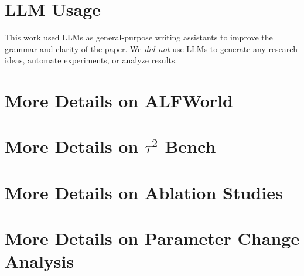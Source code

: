 \documentclass{article}
\theoremstyle{plain}
\theoremstyle{definition}
\theoremstyle{remark}
\begin{document}




\newpage

\setcounter{table}{0}
\renewcommand{\thetable}{A\arabic{table}}
\setcounter{figure}{0}
\renewcommand{\thefigure}{A\arabic{figure}}

\appendix
\onecolumn

\section{LLM Usage}
This work used LLMs as general-purpose writing assistants to improve the grammar and clarity of the paper.
We {\it did not} use LLMs to generate any research ideas, automate experiments, or analyze results.





\section{More Details on ALFWorld}
\label{sec:More Details on ALFWorld}



\section{More Details on $\tau^2$ Bench}
\label{sec:More Details on tau2 Bench}



\section{More Details on Ablation Studies}
\label{sec:More Details on Ablation Studies}



\section{More Details on Parameter Change Analysis}
\label{sec:More Details on Analysis}





\end{document}
